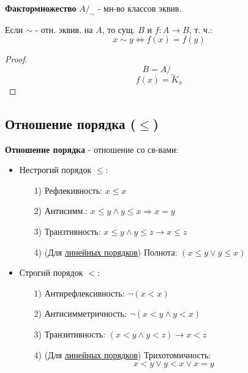 \begin{definition}
\textbf{Фактормножество} $A/_{\sim}$ - мн-во классов эквив.
\end{definition}
\begin{theorem}
Если $\sim$ - отн. эквив. на $A$, то сущ. $B$ и $f: A \rightarrow B$, т. ч.:
\[
x \sim y \iff f(x) = f(y)
\]
\end{theorem}
\begin{proof}
\[
B = A/_{\sim}
\]
\[
f(x) = K_x
\]
\end{proof}
\subsection{Отношение порядка ($\leq$)}
\begin{definition}
\textbf{Отношение порядка} - отношение со св-вами:
\begin{itemize}
  \item Нестрогий порядок $\leq$:
\begin{itemize}
  \item [1) ] Рефлекивность: $x \leq x$
  \item [2) ] Антисимм.: $x \leq y \land y \leq x \Rightarrow x = y$
  \item [3) ] Транзтивность: $x \leq y \land y \leq z \rightarrow x \leq z$
  \item [4) ] (Для \underline{линейных порядков}) Полнота: $(x \leq y \lor y \leq x)$
\end{itemize}
  \item Строгий порядок $<$:
    \begin{itemize}
      \item [1) ] Антирефлексивность: $\neg(x < x)$
      \item [2) ] Антисимметричность: $\neg(x < y \land y < x)$
      \item [3) ] Транзитивность: $(x < y \land y < z) \rightarrow x < z$
      \item [4) ] (Для \underline{линейных порядков}) Трихотомичность:
        \[
          x < y \lor y < x \lor x = y
        \]
    \end{itemize}
\end{itemize}
\end{definition}

